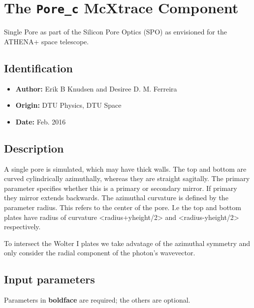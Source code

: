 \section{The \texttt{Pore\_c} McXtrace Component}
Single Pore as part of the Silicon Pore Optics (SPO) as envisioned for the ATHENA+ space telescope.

\subsection*{Identification}
\begin{itemize}
  \item \textbf{Author:} Erik B Knudsen and Desiree D. M. Ferreira
  \item \textbf{Origin:} DTU Physics, DTU Space
  \item \textbf{Date:} Feb. 2016
\end{itemize}

\subsection*{Description}
A single pore is simulated, which may have thick walls. The top and bottom are curved cylindrically azimuthally, whereas they are straight sagitally. The primary parameter specifies whether this is a primary or secondary mirror. If primary they mirror extends backwards. The azimuthal curvature is defined by the parameter radius. This refers to the center of the pore. I.e the top and bottom plates have radius of curvature \textless{}radius+yheight/2\textgreater{} and \textless{}radius-yheight/2\textgreater{} respectively.

To intersect the Wolter I plates we take advatage of the azimuthal symmetry and only consider the radial component of the photon's wavevector.

\subsection*{Input parameters}
Parameters in \textbf{boldface} are required; the others are optional.

